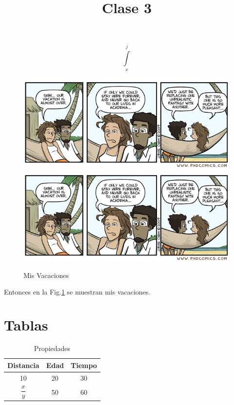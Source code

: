 \documentclass[12pt]{article}
\title{Clase 3}
\begin{document}
\maketitle


\begin{equation}
\int\limits_{x}^{j}
\end{equation}

\begin{figure}
\centering
\includegraphics[scale=0.6]{f1.png}
\includegraphics[scale=0.6]{f1.png}
\caption{Mis Vacaciones \label{fig:vacaciones}}
\end{figure}

Entonces en la Fig.\ref{fig:vacaciones} se muestran mis vacaciones.


\section{Tablas}

\begin{table}
\begin{center}
\begin{tabular}{c c c}
\hline
\hline
Distancia & Edad & Tiempo\\
\hline
10 & 20 & 30 \\
$\dfrac{x}{y}$ & 50 & 60\\
\hline 
\end{tabular}
\end{center}
\caption{Propiedades \label{tab:prop}}
\end{table}
\end{document}
